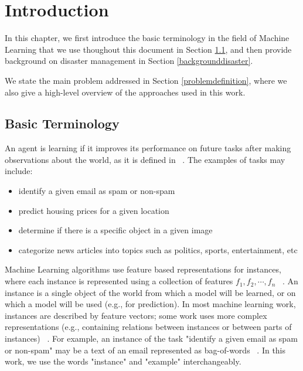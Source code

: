\cleardoublepage

\chapter{Introduction}
\label{introduction}

In this chapter, we first introduce the basic terminology in the field of Machine Learning that we use thoughout this document in Section \ref{basicterminology}, and then provide background on disaster management in Section \ref{backgrounddisaster}.

We state the main problem addressed in Section \ref{problemdefinition}, where we also give a high-level overview of the approaches used in this work. 

\section{Basic Terminology}
\label{basicterminology}

An agent is learning if it improves its performance on future tasks after making observations
about the world, as it is defined in ~\citep{rn}. The examples of tasks may include: 
\begin{itemize}
  \item identify a given email as spam or non-spam
  \item predict housing prices for a given location
  \item determine if there is a specific object in a given image
  \item categorize news articles into topics such as politics, sports, entertainment, etc
\end{itemize}

Machine Learning algorithms use feature based representations for instances, where each instance is represented using a collection of features $f_1,f_2,\cdots,f_n$ ~\citep{tom}. An instance is a single object of the world from which a model will be learned, or on which a model will be used (e.g., for prediction). In most machine learning work, instances are described by feature vectors; some work uses more complex representations (e.g., containing relations between instances or between parts of instances) ~\citep{terms}. For example, an instance of the task "identify a given email as spam or non-spam" may be a text of an email represented as bag-of-words ~\citep{bagofwords}. In this work, we use the words "instance" and "example" interchangeably. 

